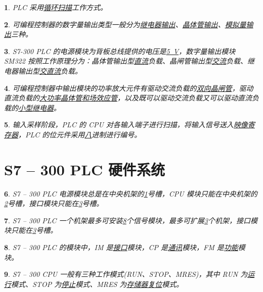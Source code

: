 \documentclass{ctexart}
\theoremstyle{change}
\newtheorem{ti}{}[section]
\begin{document}
\begin{ti}
	PLC 采用\uline{循环扫描}工作方式。
\end{ti}

\begin{ti}
	可编程控制器的数字量输出类型一般分为\uline{继电器输出}、\uline{晶体管输出}、\uline{模拟量输出}三种。
\end{ti}

\begin{ti}
	S7-300 PLC 的电源模块为背板总线提供的电压是\uline{\mbox{\SI{5}{V}}}，数字量输出模块 SM322 按照工作原理分为：晶体管输出型\uline{直流}负载、晶闸管输出型\uline{交流}负载、继电器输出型\uline{交直流}负载。
\end{ti}

\begin{ti}
	可编程控制器中输出模块的功率放大元件有驱动交流负载的\uline{双向晶闸管}，驱动直流负载的\uline{大功率晶体管和场效应管}，以及既可以驱动交流负载又可以驱动直流负载的\uline{小型继电器}。
\end{ti}

\begin{ti}
	输入采样阶段，PLC 的 CPU 对各输入端子进行扫描，将输入信号送入\uline{映像寄存器}，PLC 的位元件采用\uline{八}进制进行编号。
\end{ti}

\section{S7 -- 300 PLC 硬件系统}

\begin{ti}
	S7 -- 300 PLC 电源模块总是在中央机架的\uline{1}号槽，CPU 模块只能在中央机架的\uline{2}号槽，接口模块只能在\uline{3}号槽。
\end{ti}

\begin{ti}
	S7 -- 300 PLC 一个机架最多可安装\uline{8}个信号模块，最多可扩展\uline{3}个机架，接口模块只能在\uline{3}号槽。
\end{ti}

\begin{ti}
	S7 -- 300 PLC 的模块中，IM 是\uline{接口}模块，CP 是\uline{通讯}模块，FM 是\uline{功能}模块。
\end{ti}

\begin{ti}
	S7 -- 300 CPU 一般有三种工作模式(RUN、STOP、MRES)，其中 RUN 为\uline{运行}模式、STOP 为\uline{停止}模式、MRES 为\uline{存储器复位}模式。
\end{ti}
\end{document}
